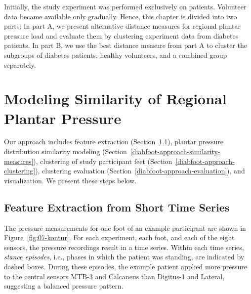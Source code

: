\documentclass[
  oneside]{book}
\begin{document}
Initially, the study experiment was performed exclusively on patients.
Volunteer data became available only gradually.
Hence, this chapter is divided into two parts:
In part A, we present alternative distance measures for regional plantar pressure load and evaluate them by clustering experiment data from diabetes patients.
In part B, we use the best distance measure from part A to cluster the subgroups of diabetes patients, healthy volunteers, and a combined group separately.

\hypertarget{diabfoot-approach}{%
\section{Modeling Similarity of Regional Plantar Pressure}\label{diabfoot-approach}}

Our approach includes feature extraction (Section~\ref{diabfoot-approach-feature-extraction}),
plantar pressure distribution similarity modeling (Section~\ref{diabfoot-approach-similarity-measures}),
clustering of study participant feet (Section~\ref{diabfoot-approach-clustering}), clustering evaluation (Section~\ref{diabfoot-approach-evaluation}), and visualization.
We present these steps below.

\hypertarget{diabfoot-approach-feature-extraction}{%
\subsection{Feature Extraction from Short Time Series}\label{diabfoot-approach-feature-extraction}}

The pressure measurements for one foot of an example participant are shown in Figure~\ref{fig:07-kontur}.
For each experiment, each foot, and each of the eight sensors, the pressure recordings result in a time series.
Within each time series, \emph{stance episodes}, i.e., phases in which the patient was standing, are indicated by dashed boxes.
During these episodes, the example patient applied more pressure to the central sensors MTB-3 and Calcaneus than Digitus-1 and Lateral, suggesting a balanced pressure pattern.
\end{document}
